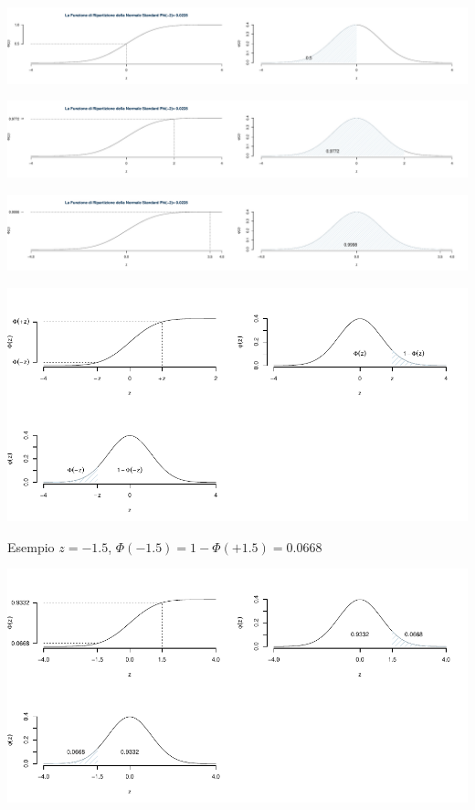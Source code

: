 \documentclass[
  11pt,
]{book}
\theoremstyle{mytheoremstyle}
\theoremstyle{mydefstyle}
\begin{document}
\begin{center}\includegraphics{Appunti_di_Statistica_2025_files/figure-latex/07c-Normale-33-3} \end{center}

\begin{center}\includegraphics{Appunti_di_Statistica_2025_files/figure-latex/07c-Normale-33-4} \end{center}

\begin{center}\includegraphics{Appunti_di_Statistica_2025_files/figure-latex/07c-Normale-33-5} \end{center}

\begin{center}\includegraphics{Appunti_di_Statistica_2025_files/figure-latex/07c-Normale-9-1} \end{center}

Esempio \(z=-1.5\), \(\Phi(-1.5)=1-\Phi(+1.5)=0.0668\)

\begin{center}\includegraphics{Appunti_di_Statistica_2025_files/figure-latex/07c-Normale-10-1} \end{center}
\end{document}
